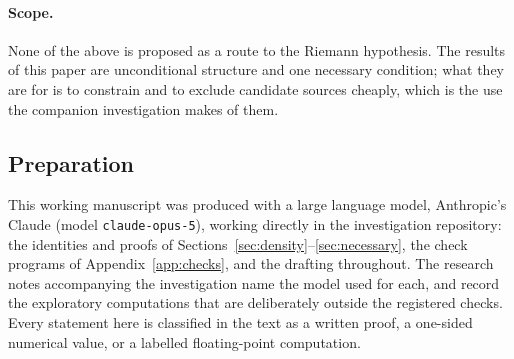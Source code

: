 \paragraph{Scope.} None of the above is proposed as a route to the Riemann
hypothesis. The results of this paper are unconditional structure and one
necessary condition; what they are for is to constrain and to exclude candidate
sources cheaply, which is the use the companion investigation makes of them.

\subsection*{Preparation}
This working manuscript was produced with a large language model, Anthropic's
Claude (model \texttt{claude-opus-5}), working directly in the investigation
repository: the identities and proofs of
Sections~\ref{sec:density}--\ref{sec:necessary}, the check programs of
Appendix~\ref{app:checks}, and the drafting throughout. The research notes
accompanying the investigation name the model used for each, and record the
exploratory computations that are deliberately outside the registered checks.
Every statement here is classified in the text as a written proof, a one-sided
numerical value, or a labelled floating-point computation.
